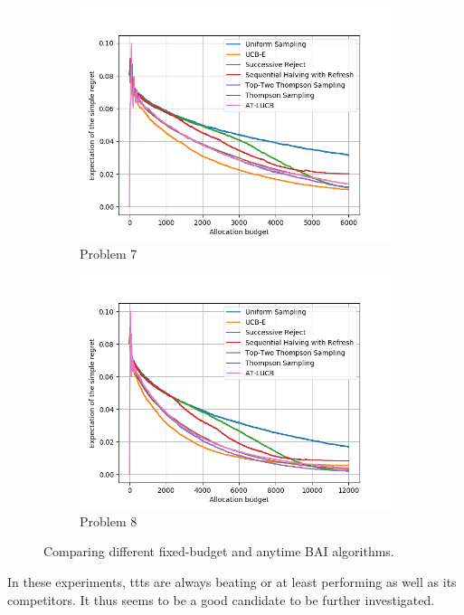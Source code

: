 \begin{figure}[ht]
\begin{subfigure}[t]{0.25\textwidth}
    \centering\includegraphics[width=\textwidth]{Chapter6/img/bai/setting7.png}
    \caption{Problem 7}
  \end{subfigure}
  \begin{subfigure}[t]{0.25\textwidth}
    \centering\includegraphics[width=\textwidth]{Chapter6/img/bai/setting8.png}
    \caption{Problem 8}
  \end{subfigure}
  \caption{Comparing different fixed-budget and anytime BAI algorithms.}
  \label{fig:bai}
\end{figure}

In these experiments, \gls{ttts} are always beating or at least performing as well as its competitors. It thus seems to be a good candidate to be further investigated.

